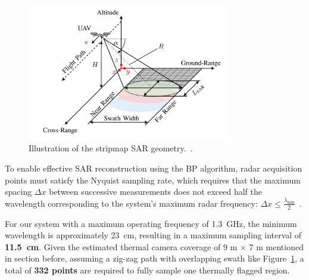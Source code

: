 \begin{figure}[H]
    \centering
    \includegraphics[height=6cm]{figs/Huirui/gpr_swath}
    \caption{Illustration of the stripmap \gls{SAR} geometry.~\cite{schartel2018uav}.}
    \label{fig:swath_geometry}
\end{figure}

To enable effective \gls{SAR} reconstruction using the \gls{BP} algorithm, radar acquisition points must satisfy the Nyquist sampling rate, which requires that the maximum spacing $\Delta x$ between successive measurements does not exceed half the wavelength corresponding to the system's maximum radar frequency: \(\Delta x \leq \frac{\lambda_{\text{min}}}{2}\)~\cite{9758040}.

For our system with a maximum operating frequency of 1.3~GHz, the minimum wavelength is approximately 23~cm, resulting in a maximum sampling interval of \textbf{11.5~cm}. Given the estimated thermal camera coverage of 9 m × 7 m mentioned in section before, assuming a zig-zag path with overlapping swath like Figure~\ref{fig:swath_geometry}, a total of \textbf{332 points} are required to fully sample one thermally flagged region. 